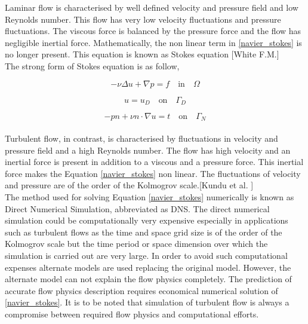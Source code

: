 \documentclass[a4paper]{book}
\begin{document}
Laminar flow is characterised by well defined velocity and pressure field and low Reynolds number. This flow has very low velocity fluctuations and pressure fluctuations. The viscous force is balanced by the pressure force and the flow has negligible inertial force. Mathematically, the non linear term in \eqref{navier_stokes} is no longer present. This equation is known as Stokes equation [White F.M.\cite{white}]\\

The strong form of Stokes equation is as follow,

\begin{equation} \label{stokes_strong_form}
-\nu \Delta u + \nabla p = f \quad \textrm{in} \quad \Omega
\end{equation}

\begin{equation} \label{dirichlet condition stokes}
u = u_D \quad \textrm{on} \quad \Gamma_D
\end{equation}

\begin{equation} \label{neumann condition stokes}
-pn + \nu n \cdot \nabla u = t \quad \textrm{on} \quad \Gamma_N
\end{equation}
\\

Turbulent flow, in contrast, is characterised by fluctuations in velocity and pressure field and a high Reynolds number. The flow has high velocity and an inertial force is present in addition to a viscous and a pressure force. This inertial force makes the Equation \eqref{navier_stokes} non linear. The fluctuations of velocity and pressure are of the order of the Kolmogrov scale.[Kundu et al. \cite{Kundu}]\\

The method used for solving Equation \eqref{navier_stokes} numerically is known as Direct Numerical Simulation, abbreviated as DNS. The direct numerical simulation could be computationally very expensive especially in applications such as turbulent flows as the time and space grid size is of the order of the Kolmogrov scale but the time period or space dimension over which the simulation is carried out are very large. In order to avoid such computational expenses alternate models are used replacing the original model. However, the alternate model can not explain the flow physics completely. The prediction of accurate flow physics description requires economical numerical solution of \eqref{navier_stokes}. It is to be noted that simulation of turbulent flow is always a compromise between required flow physics and computational efforts.
\end{document}
